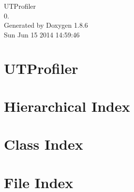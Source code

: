 \documentclass[twoside]{book}
\newcommand{\clearemptydoublepage}{%
  \newpage{\pagestyle{empty}\cleardoublepage}%
}
\begin{document}
\hypersetup{pageanchor=false}
\begin{titlepage}
\vspace*{7cm}
\begin{center}%
{\Large U\-T\-Profiler \\[1ex]\large 0. }\\
\vspace*{1cm}
{\large Generated by Doxygen 1.8.6}\\
\vspace*{0.5cm}
{\small Sun Jun 15 2014 14:59:46}\\
\end{center}
\end{titlepage}
\clearemptydoublepage
\tableofcontents
\clearemptydoublepage
{}
\hypersetup{pageanchor=true}

\chapter{U\-T\-Profiler}
\label{md__home_timothee__documents__l_o21__u_t_profiler__r_e_a_d_m_e}
\hypertarget{md__home_timothee__documents__l_o21__u_t_profiler__r_e_a_d_m_e}{}

\chapter{Hierarchical Index}

\chapter{Class Index}

\chapter{File Index}

\end{document}
